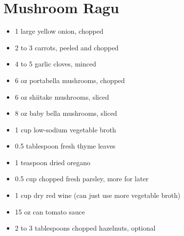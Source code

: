 \section{Mushroom Ragu}

\begin{itemize}
\item 1 large yellow onion, chopped
\item 2 to 3 carrots, peeled and chopped
\item 4 to 5 garlic cloves, minced
\item 6 oz portabella mushrooms, chopped
\item 6 oz shiitake mushrooms, sliced
\item 8 oz baby bella mushrooms, sliced
\item 1 cup low-sodium vegetable broth
\item 0.5 tablespoon fresh thyme leaves
\item 1 teaspoon dried oregano
\item 0.5 cup chopped fresh parsley, more for later
\item 1 cup dry red wine (can just use more vegetable broth)
\item 15 oz can tomato sauce
\item 2 to 3 tablespoons chopped hazelnuts, optional
\end{itemize}

